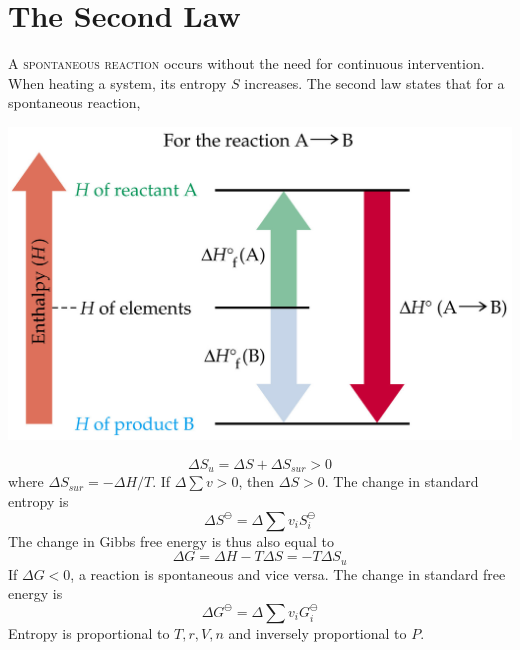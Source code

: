 \documentclass{tufte-book}
\begin{document}
\section{The Second Law}
\textsc{A spontaneous reaction} occurs without the need for continuous intervention. When heating a system, its entropy $S$ increases. The second law states that for a spontaneous reaction,
%
\begin{marginfigure}[5mm]
\begin{center}
  \includegraphics[width=\textwidth]{enthalpy}
\end{center}
\end{marginfigure}
%
\begin{equation}
  \Delta S_u = \Delta S + \Delta S_{sur} > 0
\end{equation}
where $\Delta S_{sur} = - \Delta H/T$. If $\Delta \sum v > 0$, then $\Delta S > 0$. The change in standard entropy is \begin{equation}
  \Delta S^\ominus = \Delta \sum v_i S^\ominus_i
\end{equation}
The change in Gibbs free energy is thus also equal to \begin{equation}
  \Delta G = \Delta H - T \Delta S = -T \Delta S_u
\end{equation}
If $\Delta G < 0$, a reaction is spontaneous and vice versa. The change in standard free energy is \begin{equation}
  \Delta G^\ominus = \Delta \sum v_i G^\ominus_i
\end{equation}
Entropy is proportional to $T, r, V, n$ and inversely proportional to $P$.
\end{document}
